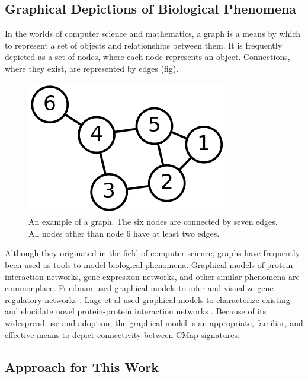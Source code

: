 \documentclass[12pt]{article}
\begin{document}
\subsection{Graphical Depictions of Biological Phenomena}

In the worlds of computer science and mathematics, a graph is a means by which to represent a set of objects and relationships between them. It is frequently depicted as a set of nodes, where each node represents an object. Connections, where they exist, are represented by edges (fig).

\begin{figure}[h]
\centering
\includegraphics[scale=0.5]{img/graph}
\caption{An example of a graph. The six nodes are connected by seven edges. All nodes other than node 6 have at least two edges.}
\label{fig:graph}
\end{figure} 

Although they originated in the field of computer science, graphs have frequently been used as tools to model biological phenomena. Graphical models of protein interaction networks, gene expression networks, and other similar phenomena are commonplace. Friedman used graphical models to infer and visualize gene regulatory networks \cite{friedman_inferring_2004}. Lage et al used graphical models to characterize existing and elucidate novel protein-protein interaction networks \cite{lage_human_2007}. Because of its widespread use and adoption, the graphical model is an appropriate, familiar, and effective means to depict connectivity between CMap signatures.

\subsection{Approach for This Work}
\end{document}
